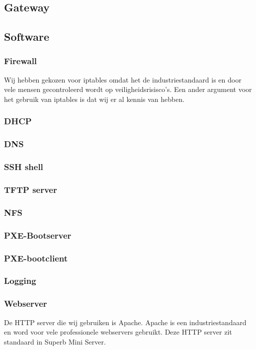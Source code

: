 \documentclass[12pt]{article}
\begin{document}
\subsection{Gateway}
\subsection{Software}
\subsubsection{Firewall}
Wij hebben gekozen voor iptables omdat het de industriestandaard is en door vele mensen gecontroleerd wordt op veiligheidsrisisco's. Een ander argument voor het gebruik van iptables is dat wij er al kennis van hebben.
\subsubsection{DHCP}

\subsubsection{DNS}
\subsubsection{SSH shell}
\subsubsection{TFTP server}
\subsubsection{NFS}
\subsubsection{PXE-Bootserver}
\subsubsection{PXE-bootclient}
\subsubsection{Logging}
\subsubsection{Webserver}
De HTTP server die wij gebruiken is Apache. Apache is een industriestandaard en word voor vele professionele webservers gebruikt. Deze HTTP server zit standaard in Superb Mini Server.
\end{document}
